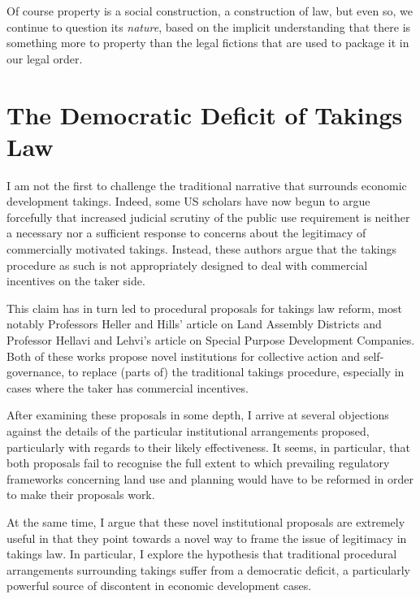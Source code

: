 {Of course property is a social construction, a construction of law, but even so, we continue to question its {\it nature}, based on the implicit understanding that there is something more to property than the legal fictions that are used to package it in our legal order.
}

\section{The Democratic Deficit of Takings Law}

I am not the first to challenge the traditional narrative that surrounds economic development takings. Indeed, some US scholars have now begun to argue forcefully that increased judicial scrutiny of the public use requirement is neither a necessary nor a sufficient response to concerns about the legitimacy of commercially motivated takings. Instead, these authors argue that the takings procedure as such is not appropriately designed to deal with commercial incentives on the taker side.

This claim has in turn led to procedural proposals for takings law reform, most notably Professors Heller and Hills' article on Land Assembly Districts and Professor Hellavi and Lehvi's article on Special Purpose Development Companies. Both of these works propose novel institutions for collective action and self-governance, to replace (parts of) the traditional takings procedure, especially in cases where the taker has commercial incentives. 

After examining these proposals in some depth, I arrive at several objections against the details of the particular institutional arrangements proposed, particularly with regards to their likely effectiveness. It seems, in particular, that both proposals fail to recognise the full extent to which prevailing regulatory frameworks concerning land use and planning would have to be reformed in order to make their proposals work.

At the same time, I argue that these novel institutional proposals are extremely useful in that they point towards a novel way to frame the issue of legitimacy in takings law. In particular, I explore the hypothesis that traditional procedural arrangements surrounding takings suffer from a democratic deficit, a particularly powerful source of discontent in economic development cases.

